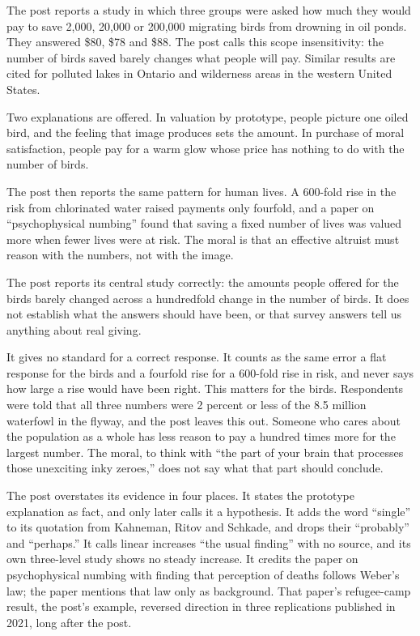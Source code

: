 \begin{afterword}
\summaryhead

The post reports a study in which three groups were asked how much they would pay to save 2,000, 20,000 or 200,000 migrating birds from drowning in oil ponds. They answered \$80, \$78 and \$88. The post calls this scope insensitivity: the number of birds saved barely changes what people will pay. Similar results are cited for polluted lakes in Ontario and wilderness areas in the western United States.

Two explanations are offered. In valuation by prototype, people picture one oiled bird, and the feeling that image produces sets the amount. In purchase of moral satisfaction, people pay for a warm glow whose price has nothing to do with the number of birds.

The post then reports the same pattern for human lives. A 600-fold rise in the risk from chlorinated water raised payments only fourfold, and a paper on ``psychophysical numbing'' found that saving a fixed number of lives was valued more when fewer lives were at risk. The moral is that an effective altruist must reason with the numbers, not with the image.

\responsehead

The post reports its central study correctly: the amounts people offered for the birds barely changed across a hundredfold change in the number of birds. It does not establish what the answers should have been, or that survey answers tell us anything about real giving.

It gives no standard for a correct response. It counts as the same error a flat response for the birds and a fourfold rise for a 600-fold rise in risk, and never says how large a rise would have been right. This matters for the birds. Respondents were told that all three numbers were 2 percent or less of the 8.5 million waterfowl in the flyway, and the post leaves this out. Someone who cares about the population as a whole has less reason to pay a hundred times more for the largest number. The moral, to think with ``the part of your brain that processes those unexciting inky zeroes,'' does not say what that part should conclude.

The post overstates its evidence in four places. It states the prototype explanation as fact, and only later calls it a hypothesis. It adds the word ``single'' to its quotation from Kahneman, Ritov and Schkade, and drops their ``probably'' and ``perhaps.'' It calls linear increases ``the usual finding'' with no source, and its own three-level study shows no steady increase. It credits the paper on psychophysical numbing with finding that perception of deaths follows Weber's law; the paper mentions that law only as background. That paper's refugee-camp result, the post's example, reversed direction in three replications published in 2021, long after the post.


\end{afterword}
